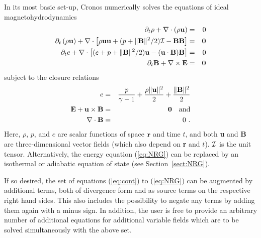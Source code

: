 In its most basic set-up, {\sc Cronos} numerically solves the
equations of ideal magnetohydrodynamics 
\begin{eqnarray}
  \label{eq:cont}
  \partial_t \rho + \nabla \cdot \left( \rho {\bf u} \right) &=& 0 \\
  \partial_t \left( \rho {\bf u} \right)
  + \nabla \cdot \left[ \rho {\bf u u} 
    + (p + \|{\bf B}\|^2/2 ) {\cal I} - {\bf B B} \right] &=& {\bf 0} \\
  \label{eq:NRG}
  \partial_t e + \nabla \cdot \left[(e+p+\|{\bf B}\|^2/2) {\bf u}
    - ({\bf u} \cdot {\bf B}) {\bf B} \right] &=& 0 \\
 \partial_t {\bf B} + \nabla \times {\bf E} &=& {\bf 0} \\
\end{eqnarray}
subject to the closure relations
\begin{eqnarray}
  e &=& \frac{p}{\gamma-1} + \frac{\rho \|{\bf u}\|^2 }{2}
  + \frac{\|{\bf B}\|^2}{2} \\
  \label{eq:ohm}
  {\bf E} + {\bf u} \times {\bf B} &=& {\bf 0} \quad \mbox{and} \\
  \nabla \cdot {\bf B} &=& 0 \ .
\end{eqnarray}
Here, $\rho$, $p$, and $e$ are scalar functions of space ${\bf r}$ and
time $t$, and both {\bf u} and {\bf B} are three-dimensional vector
fields (which also depend on {\bf r} and $t$). ${\cal I}$ is the unit
tensor. Alternatively, the energy equation (\ref{eq:NRG}) can be
replaced by an isothermal or adiabatic equation of state (see
Section~\ref{sect:NRG}).

If so desired, the set of equations
(\ref{eq:cont}) to (\ref{eq:NRG}) can be augmented by additional
terms, both of divergence form and as source terms on the respective
right hand sides. This also includes the possibility to negate any
terms by adding them again with a minus sign.  In addition, the user
is free to provide an arbitrary number of additional equations for
additional variable fields which are to be solved simultaneously with
the above set.
